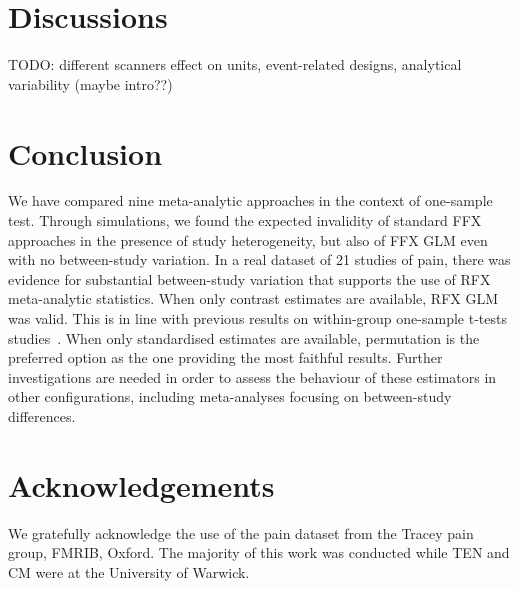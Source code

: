 \documentclass[preprint]{elsarticle}
\begin{document}


\section{Discussions}\label{sec:discussion}    
TODO: different scanners effect on units, event-related designs, analytical variability (maybe intro??)

\section{Conclusion}\label{sec_ccl}
We have compared nine meta-analytic approaches in the context of one-sample test. Through simulations, we found the expected invalidity of standard FFX approaches in the presence of study heterogeneity, but also of FFX GLM even with no between-study variation. In a real dataset of 21 studies of pain, there was evidence for substantial between-study variation that supports the use of RFX meta-analytic statistics. When only contrast estimates are available, RFX GLM was valid. This is in line with previous results on within-group one-sample t-tests studies~\cite{Mumford2009}. When only standardised estimates are available, permutation is the preferred option as the one providing the most faithful results. Further investigations are needed in order to assess the behaviour of these estimators in other configurations, including meta-analyses focusing on between-study differences.


\section{Acknowledgements}
We gratefully acknowledge the use of the pain dataset from the Tracey pain group, FMRIB, Oxford. The majority of this work was conducted while TEN and CM were at the University of Warwick.
\end{document}
